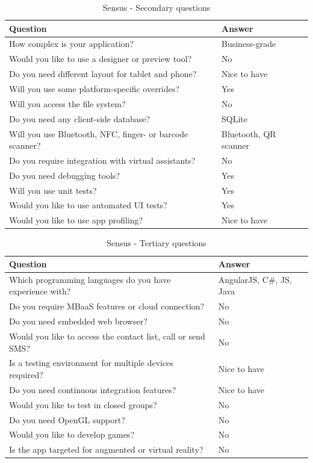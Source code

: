 \documentclass[english,master,public,dept460,male,cpdeclaration,oneside]{diploma}
\begin{document}
\begin{table}[!h]
	\centering
	\caption{Sensus - Secondary questions}
	\label{table:sensusSecondary}
	\begin{tabular}{p{7.5cm} | p{5cm}}
		\toprule		
		\textbf{Question} &	\textbf{Answer} \\
		\midrule
		How complex is your application? & Business-grade \\
		Would you like to use a designer or preview tool? & No \\
		Do you need different layout for tablet and phone? & Nice to have \\
		Will you use some platform-specific overrides? & Yes \\
		Will you access the file system? & No \\
		Do you need any client-side database? & SQLite \\
		Will you use Bluetooth, NFC, finger- or barcode scanner? & Bluetooth, QR scanner \\
		Do you require integration with virtual assistants? & No \\
		Do you need debugging tools? & Yes \\
		Will you use unit tests? & Yes \\
		Would you like to use automated UI tests? & Yes \\
		Would you like to use app profiling? & Nice to have \\		
		\midrule
	\end{tabular}
\end{table}

\begin{table}[!h]
	\centering
	\caption{Sensus - Tertiary questions}
	\label{table:sensusTertiary}
	\begin{tabular}{p{9.5cm} | p{3cm}}
		\toprule		
		\textbf{Question} &	\textbf{Answer} \\
		\midrule		
		Which programming languages do you have experience with? & AngularJS, C\#, JS, Java \\
		Do you require MBaaS features or cloud connection? & No \\
		Do you need embedded web browser? & No \\
		Would you like to access the contact list, call or send SMS? & No \\
		Is a testing environment for multiple devices required? & Nice to have \\
		Do you need continuous integration features? & Nice to have \\
		Would you like to test in closed groups? & No \\
		Do you need OpenGL support? & No \\
		Would you like to develop games? & No \\
		Is the app targeted for augmented or virtual reality? & No \\			
		\midrule
	\end{tabular}
\end{table}
\end{document}
